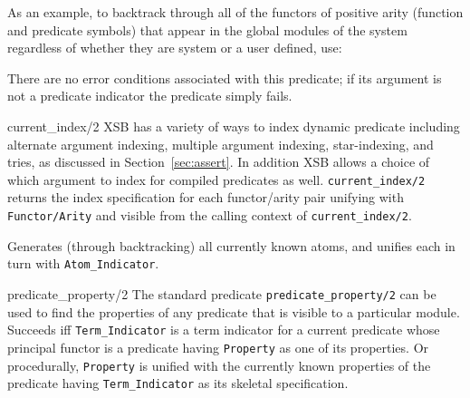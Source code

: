\begin{description}
As an example, to backtrack through all of the functors of positive
arity (function and predicate symbols) that appear in the global
modules of the system regardless of whether they are system or a user
defined, use:


    There are no error conditions associated with this predicate; if its 
    argument is not a predicate indicator the predicate simply fails.

{current\_index/2}
%
XSB has a variety of ways to index dynamic predicate including
alternate argument indexing, multiple argument indexing,
star-indexing, and tries, as discussed in Section~\ref{sec:assert}.
In addition XSB allows a choice of which argument to index for
compiled predicates as well.  {\tt current\_index/2} returns the index
specification for each functor/arity pair unifying with {\tt
Functor/Arity} and visible from the calling context of  {\tt current\_index/2}.

    Generates (through backtracking) all currently known atoms, and unifies
    each in turn with {\tt Atom\_Indicator}. 

\label{PredProp}
{predicate\_property/2}
    The standard predicate {\tt predicate\_property/2} can be used to find 
    the properties of any predicate that is visible to a particular module.
    Succeeds iff {\tt Term\_Indicator} is a term indicator for a current 
    predicate whose principal functor is a predicate having {\tt Property} 
    as one of its properties. Or procedurally, {\tt Property} is unified 
    with the currently known properties of the predicate having 
    {\tt Term\_Indicator} as its skeletal specification.
    

\end{description}
